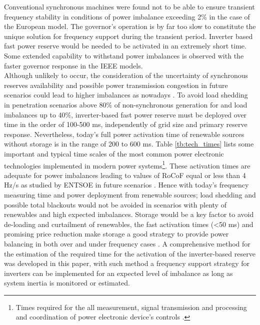 Conventional synchronous machines were found not to be able to ensure transient frequency stability in conditions of power imbalance exceeding 2\% in the case of the European model. The governor's operation is by far too slow to constitute the unique solution for frequency support during the transient period. Inverter based fast power reserve would be needed to be activated in an extremely short time. Some extended capability to withstand power imbalances is observed with the faster governor response in the IEEE models. \\

Although unlikely to occur, the consideration of the uncertainty of synchronous reserves availability and possible power transmission congestion in future scenarios could lead to higher imbalances as nowadays \cite{dena2014}. To avoid load shedding in penetration scenarios above 80\% of non-synchronous generation for and load imbalances up to 40\%, inverter-based fast power reserve must be deployed over time in the order of 100-500 ms, independently of grid size and primary reserve response. Nevertheless, today’s full power activation time of renewable sources without storage is in the range of 200 to 600 ms. Table \ref{tb:tech_times} lists some important and typical time scales of the most common power electronic technologies implemented in modern power systems\footnote{Times required for the all measurement, signal transmission and processing and coordination of power electronic device's controls \cite{miller2017technology}.}. These activation times are adequate for power imbalances leading to values of RoCoF equal or less than 4 Hz/s as studied by ENTSOE in future scenarios \cite{ENTSOE.2016}. Hence with today’s frequency measuring time and power deployment from renewable sources; load shedding and possible total blackouts would not be avoided in scenarios with plenty of renewables and high expected imbalances. Storage would be a key factor to avoid de-loading and curtailment of renewables, the fast activation times (<50 ms) and promising price reduction make storage a good strategy to provide power balancing in both over and under frequency cases \cite{irena2017electricity}. A comprehensive method for the estimation of the required time for the activation of the inverter-based reserve was developed in this paper, with such method a frequency support strategy for inverters can be implemented for an expected level of imbalance as long as system inertia is monitored or estimated.\\

